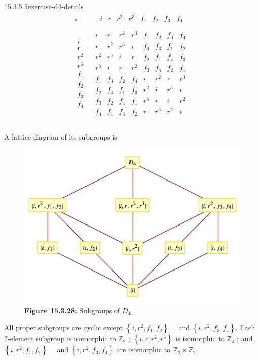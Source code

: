 \documentclass[twoside,10pt,]{book}
\numberwithin{equation}{section}
\begin{document}
\begin{divisionsolution}{15.3.5.5}{}{exercise-d4-details}
\begin{equation*}
\begin{array}{c|c}
\circ  & \textrm{    }
\begin{array}{cccccccc}
i  & r  & r^2 & r^3  & f_1 &  f_2 & f_3 & f_4 \\
\end{array}
\\
\hline
\begin{array}{c}
i \\
r \\
r^2 \\
r^3 \\
f_1 \\
f_2 \\
f_3 \\
f_4 \\
\end{array}
& 
\begin{array}{cccccccc}
i & r & r^2 & r^3 & f_1 & f_2 & f_3 & f_4 \\
r & r^2 & r^3 & i & f_4 & f_3 & f_1 & f_2 \\
r^2 & r^3 & i & r & f_2 & f_1 & f_4 & f_3 \\
r^3 & i & r & r^2 & f_3 & f_4 & f_2 & f_1 \\
f_1 & f_3 & f_2 & f_4 & i & r^2 & r  & r^3 \\
f_2 & f_4 & f_1 & f_3 & r^2 & i & r^3 & r \\
f_3 & f_2 & f_4 & f_1 & r^3 & r & i & r^2 \\
f_4 & f_1 & f_3 & f_2 & r & r^3 & r^2 & i \\
\end{array}
\\
\end{array}
\end{equation*}
%
\par
\hypertarget{p-5508}{}%
A lattice diagram of its subgroups is%
\begin{figure}
\centering
\includegraphics[width=0.8\linewidth]{images/fig-d4-subgroups.png}
\caption*{\textbf{Figure 15.3.28:} Subgroups of \(D_4\)}
\end{figure}
\hypertarget{p-5509}{}%
All proper subgroups are cyclic except \(\left\{i,r^2,f_1,f_2\right\}\)\(\textrm{ }\textrm{ }\)and \(\left\{i,r^2,f_3,f_4\right\}\).  Each 2-element subgroup is isomorphic to \(\mathbb{Z}_2\) ; \(\left\{i,r,r^2,r^3\right\}\) is isomorphic to \(\mathbb{Z}_4\) ; and \(\left\{i,r^2,f_1,f_2\right\}\)\(\textrm{ }\textrm{ }\)and \(\left\{i,r^2,f_3,f_4\right\}\) are isomorphic to \(\mathbb{Z}_2\times \mathbb{Z}_2\).%
\end{divisionsolution}%
\end{document}
